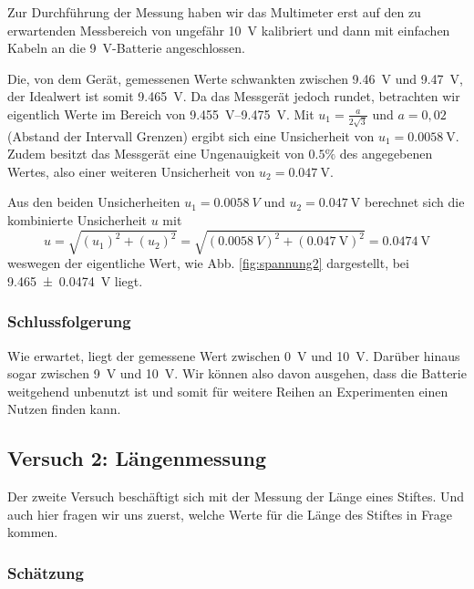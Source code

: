 \documentclass[11pt,a4paper,titlepage, ngerman]{article}
\begin{document}
				Zur Durchführung der Messung haben wir das Multimeter erst auf den zu erwartenden Messbereich von ungefähr \SI{10}{\V} kalibriert und dann mit einfachen Kabeln an die \SI{9}{\V}-Batterie angeschlossen.
						
				Die, von dem Gerät, gemessenen Werte schwankten zwischen \SI{9,46}{\V} und \SI{9,47}{\V}, der Idealwert ist somit \SI{9,465}{\V}. Da das Messgerät jedoch rundet, betrachten wir eigentlich Werte im Bereich von \SIrange{9,455}{9,475}{\V}. Mit $u_1 =  \frac{a}{2\sqrt{3} }$ und $a=0,02$ (Abstand der Intervall Grenzen) ergibt sich eine Unsicherheit von $u_1 = \SI{0,0058}{\V}$.
				Zudem besitzt das Messgerät eine Ungenauigkeit von $0.5\%$ des angegebenen Wertes, also einer weiteren Unsicherheit von  $u_2 = \SI{0,047}{\V}$. 
				 	
				Aus den beiden Unsicherheiten $u_1=\SI{0,0058}{V}$ und $u_2= \SI{0,047}{\V}$ berechnet sich die kombinierte Unsicherheit $u$ mit
				\begin{equation*}
					u = \sqrt{\left( u_1 \right)^2 + \left( u_2 \right)^2}
					= \sqrt{\left( \SI{0,0058}{V} \right)^2 + \left( \SI{0,047}{\V} \right)^2}
					= \SI{0,0474}{\V}
				\end{equation*}
				weswegen der eigentliche Wert, wie Abb. \ref{fig:spannung2} dargestellt, bei \SI{9,465 \pm 0,0474}{\V}  liegt.
			
			\subsubsection{Schlussfolgerung}
				
				Wie erwartet, liegt der gemessene Wert zwischen \SI{0}{\V} und \SI{10}{\V}. Darüber hinaus sogar zwischen \SI{9}{\V} und \SI{10}{\V}. Wir können also davon ausgehen, dass die Batterie weitgehend unbenutzt ist und somit für weitere Reihen an Experimenten einen Nutzen finden kann.
									
		\subsection{Versuch 2: Längenmessung}
			\label{2.2}	
			
			Der zweite Versuch beschäftigt sich mit der Messung der Länge eines Stiftes. Und auch hier fragen wir uns zuerst, welche Werte für die Länge des Stiftes in Frage kommen.
			
			\subsubsection{Schätzung}
				\label{2.2.1}	
				
\end{document}
